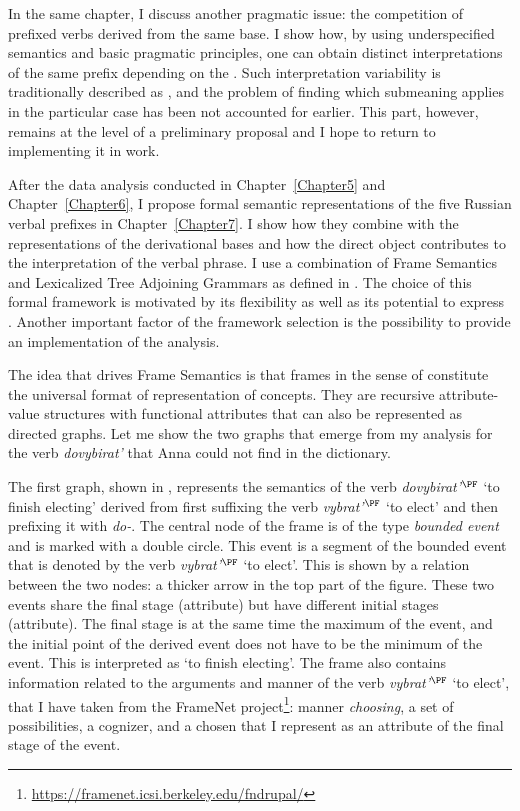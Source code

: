 In the same chapter, I discuss another pragmatic issue: the competition of prefixed verbs derived from the same base. I show how, by using underspecified semantics and basic pragmatic principles, one can obtain distinct interpretations of the same prefix depending on the . Such interpretation variability is traditionally described as , and the problem of finding which submeaning applies in the particular case has been not accounted for earlier. This part, however, remains at the level of a preliminary proposal and I hope to return to implementing it in  work.

After the data analysis conducted in Chapter~\ref{Chapter5} and Chapter~\ref{Chapter6}, I propose formal semantic representations of the five Russian verbal prefixes in Chapter~\ref{Chapter7}. I show how they combine with the representations of the derivational bases and how the direct object contributes to the interpretation of the verbal phrase. I use a combination of Frame Semantics and Lexicalized Tree Adjoining Grammars as defined in \citealt{KallmeyerOsswald:13}. The choice of this formal framework is motivated by its flexibility as well as its potential to express . Another important factor of the framework selection is the possibility to provide an implementation of the analysis. 

The idea that drives Frame Semantics \citep{Loebner:2014} is that frames in the sense of \citet{Barsalou:92} constitute the universal format of representation of concepts. They are recursive attribute-value structures with functional attributes that can also be represented as directed graphs. Let me show the two graphs that emerge from my analysis for the verb \textit{dovybirat'} that Anna could not find in the dictionary.

The first graph, shown in , represents the semantics of the verb \textit{dovybirat'}$^{\PF}$ `to finish electing' derived from first suffixing the verb \textit{vybrat'}$^{\PF}$ `to elect' and then prefixing it with \textit{do-}. The central node of the frame is of the type \textit{bounded event} and is marked with a double circle. This event is a segment of the bounded event that is denoted by the verb \textit{vybrat'}$^{\PF}$ `to elect'. This is shown by a relation between the two nodes: a thicker arrow in the top part of the figure. These two events share the final stage (\FIN attribute) but have different initial stages (\INIT attribute). The final stage is at the same time the maximum of the event, and the initial point of the derived event does not have to be the minimum of the event. This is interpreted as `to finish electing'. The frame also contains information related to the arguments and manner of the verb \textit{vybrat'}$^{\PF}$ `to elect', that I have taken from the FrameNet project\footnote{\url{https://framenet.icsi.berkeley.edu/fndrupal/}}: manner \textit{choosing}, a set of possibilities, a cognizer, and a chosen that I represent as an attribute of the final stage of the event.

